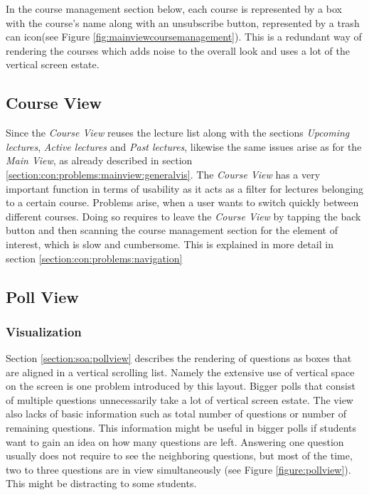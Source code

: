 In the course management section below, each course is represented by a box with the course's name along with an unsubscribe button, represented by a trash can icon(see Figure \ref{fig:mainviewcoursemanagement}).
This is a redundant way of rendering the courses which adds noise to the overall look
and uses a lot of the vertical screen estate.

\subsection{Course View}
\label{section:con:problems:courseview}
Since the \emph{Course View} reuses the lecture list along with the sections \emph{Upcoming lectures}, \emph{Active lectures} and \emph{Past lectures}, likewise the same issues arise as for the \emph{Main View}, as already described in section \ref{section:con:problems:mainview:generalvis}. 
The \emph{Course View} has a very important function in terms of usability as it acts as a filter for lectures belonging to a certain course. Problems arise, when a user wants to switch quickly between different courses. Doing so requires to leave the \emph{Course View} by tapping the back button and then scanning the course management section for the element of interest, which is slow and cumbersome. This is explained in more detail in section \ref{section:con:problems:navigation}

\subsection{Poll View}

\subsubsection{Visualization}
\label{section:con:problems:pollview}

Section \ref{section:soa:pollview} describes the rendering of questions as boxes that are aligned in a vertical scrolling list. Namely the extensive use of vertical space on the screen is one problem introduced by this layout. Bigger polls that consist of multiple questions unnecessarily take a lot of vertical screen estate. The view also lacks of basic information such as total number of questions or number of remaining questions. This information might be useful in bigger polls if students want to gain an idea on how many questions are left.
Answering one question usually does not require to see the neighboring questions, but most of the time, two to three questions are in view simultaneously (see Figure \ref{figure:pollview}). This might be distracting to some students.

